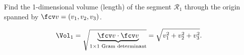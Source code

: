 \begin{frame}
\begin{example}
Find the 1-dimensional volume (length) of the segment $\mathcal R_1$ through the origin spanned by $\fcv v=(v_1,v_2,v_3) $.

\[
\Vol_1 = \sqrt{\underbrace{ \fcv v\cdot \fcv v}_{1\times 1\text{ Gram determinant}}}= \sqrt{v_1^2+v_2^2+v_3^2}.
\]
\end{example}

\end{frame}